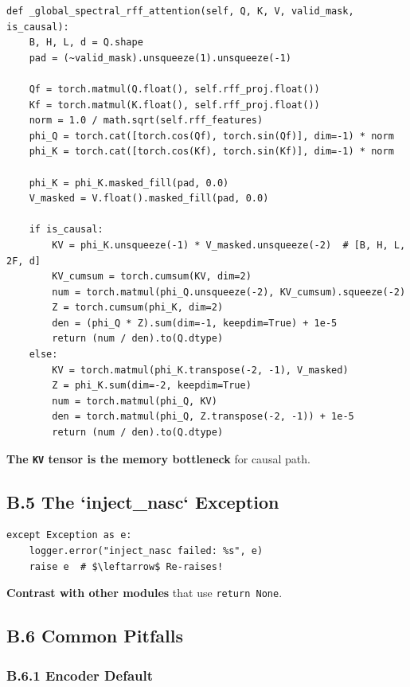 \begin{lstlisting}
def _global_spectral_rff_attention(self, Q, K, V, valid_mask, is_causal):
    B, H, L, d = Q.shape
    pad = (~valid_mask).unsqueeze(1).unsqueeze(-1)
    
    Qf = torch.matmul(Q.float(), self.rff_proj.float())
    Kf = torch.matmul(K.float(), self.rff_proj.float())
    norm = 1.0 / math.sqrt(self.rff_features)
    phi_Q = torch.cat([torch.cos(Qf), torch.sin(Qf)], dim=-1) * norm
    phi_K = torch.cat([torch.cos(Kf), torch.sin(Kf)], dim=-1) * norm
    
    phi_K = phi_K.masked_fill(pad, 0.0)
    V_masked = V.float().masked_fill(pad, 0.0)
    
    if is_causal:
        KV = phi_K.unsqueeze(-1) * V_masked.unsqueeze(-2)  # [B, H, L, 2F, d]
        KV_cumsum = torch.cumsum(KV, dim=2)
        num = torch.matmul(phi_Q.unsqueeze(-2), KV_cumsum).squeeze(-2)
        Z = torch.cumsum(phi_K, dim=2)
        den = (phi_Q * Z).sum(dim=-1, keepdim=True) + 1e-5
        return (num / den).to(Q.dtype)
    else:
        KV = torch.matmul(phi_K.transpose(-2, -1), V_masked)
        Z = phi_K.sum(dim=-2, keepdim=True)
        num = torch.matmul(phi_Q, KV)
        den = torch.matmul(phi_Q, Z.transpose(-2, -1)) + 1e-5
        return (num / den).to(Q.dtype)
\end{lstlisting}

\textbf{The \texttt{KV} tensor is the memory bottleneck} for causal path.

\subsection{B.5 The `inject\_nasc` Exception}

\begin{lstlisting}
except Exception as e:
    logger.error("inject_nasc failed: %s", e)
    raise e  # $\leftarrow$ Re-raises!
\end{lstlisting}

\textbf{Contrast with other modules} that use \texttt{return None}.

\subsection{B.6 Common Pitfalls}

\subsubsection{B.6.1 Encoder Default}

